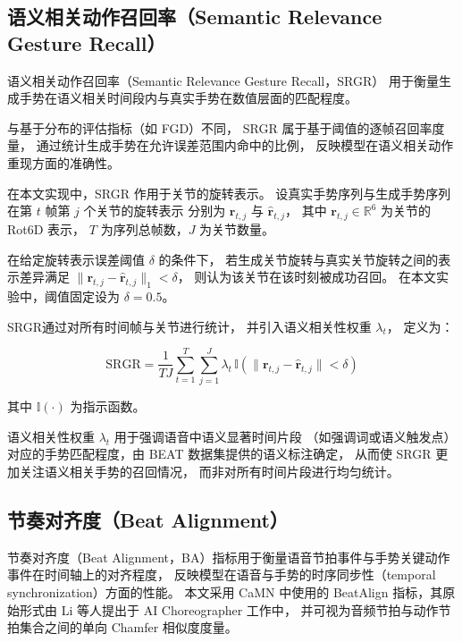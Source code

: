 \subsection{语义相关动作召回率（Semantic Relevance Gesture Recall）}
\label{subsec:srgr}

语义相关动作召回率（Semantic Relevance Gesture Recall，SRGR）\cite{beatcamn}
用于衡量生成手势在语义相关时间段内与真实手势在数值层面的匹配程度。

与基于分布的评估指标（如 FGD）不同，
SRGR 属于基于阈值的逐帧召回率度量，
通过统计生成手势在允许误差范围内命中的比例，
反映模型在语义相关动作重现方面的准确性。

在本文实现中，SRGR 作用于关节的旋转表示。
设真实手势序列与生成手势序列在第 $t$ 帧第 $j$ 个关节的旋转表示
分别为 $\mathbf{r}_{t,j}$ 与 $\hat{\mathbf{r}}_{t,j}$，
其中 $\mathbf{r}_{t,j} \in \mathbb{R}^{6}$ 为关节的 Rot6D 表示，
$T$ 为序列总帧数，$J$ 为关节数量。

在给定旋转表示误差阈值 $\delta$ 的条件下，
若生成关节旋转与真实关节旋转之间的表示差异满足
$\|\mathbf{r}_{t,j} - \hat{\mathbf{r}}_{t,j}\|_1 < \delta$，
则认为该关节在该时刻被成功召回。
在本文实验中，阈值固定设为 $\delta = 0.5$。

SRGR通过对所有时间帧与关节进行统计，
并引入语义相关性权重 $\lambda_t$，
定义为：

\begin{equation}
\mathrm{SRGR} =
\frac{1}{T J}
\sum_{t=1}^{T}
\sum_{j=1}^{J}
\lambda_t \,
\mathbb{I}
\left(
\|\mathbf{r}_{t,j} - \hat{\mathbf{r}}_{t,j}\| < \delta
\right)
\end{equation}

其中 $\mathbb{I}(\cdot)$ 为指示函数。

语义相关性权重 $\lambda_t$ 用于强调语音中语义显著时间片段
（如强调词或语义触发点）对应的手势匹配程度，由 BEAT 数据集提供的语义标注确定，
从而使 SRGR 更加关注语义相关手势的召回情况，
而非对所有时间片段进行均匀统计。

\subsection{节奏对齐度（Beat Alignment）}
\label{subsec:ba}

节奏对齐度（Beat Alignment，BA）指标用于衡量语音节拍事件与手势关键动作事件在时间轴上的对齐程度，
反映模型在语音与手势的时序同步性（temporal synchronization）方面的性能。
本文采用 CaMN 中使用的 BeatAlign 指标\cite{beatcamn}，其原始形式由 Li 等人提出于 AI Choreographer 工作中\cite{beatalign}，
并可视为音频节拍与动作节拍集合之间的单向 Chamfer 相似度度量。

